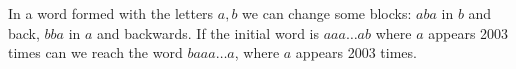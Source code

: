 In a word formed with the letters $a,b$ we can change some blocks: $aba$ in $b$ and back, $bba$ in $a$ and backwards. If the initial word is $aaa\ldots ab$ where $a$ appears 2003 times can we reach the word $baaa\ldots a$, where $a$ appears 2003 times.